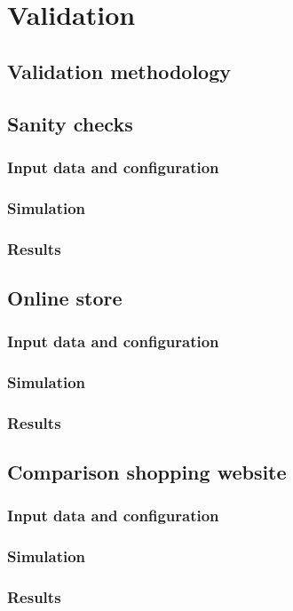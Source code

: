 \chapter{Validation} \label{chap:validation}

\section*{}

\section{Validation methodology}

\section{Sanity checks} %

\subsection{Input data and configuration}
\subsection{Simulation}
\subsection{Results}

\section{Online store}

\subsection{Input data and configuration}
\subsection{Simulation}
\subsection{Results}

\section{Comparison shopping website}

\subsection{Input data and configuration}
\subsection{Simulation}
\subsection{Results}
